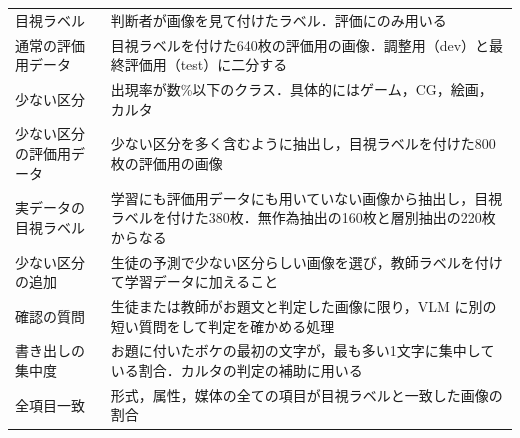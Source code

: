 \begin{table}[t]
\begin{tabular}{>{\raggedright\arraybackslash}p{}>{\raggedright\arraybackslash}p{}}
        目視ラベル & 判断者が画像を見て付けたラベル．評価にのみ用いる \\
        通常の評価用データ & 目視ラベルを付けた640枚の評価用の画像．調整用（dev）と最終評価用（test）に二分する \\
        少ない区分 & 出現率が数\%以下のクラス．具体的にはゲーム，CG，絵画，カルタ \\
        少ない区分の評価用データ & 少ない区分を多く含むように抽出し，目視ラベルを付けた800枚の評価用の画像 \\
        実データの目視ラベル & 学習にも評価用データにも用いていない画像から抽出し，目視ラベルを付けた380枚．無作為抽出の160枚と層別抽出の220枚からなる \\
        少ない区分の追加 & 生徒の予測で少ない区分らしい画像を選び，教師ラベルを付けて学習データに加えること \\
        確認の質問 & 生徒または教師がお題文と判定した画像に限り，VLM に別の短い質問をして判定を確かめる処理 \\
        書き出しの集中度 & お題に付いたボケの最初の文字が，最も多い1文字に集中している割合．カルタの判定の補助に用いる \\
        全項目一致 & 形式，属性，媒体の全ての項目が目視ラベルと一致した画像の割合 \\
        \bottomrule
    \end{tabular}
\end{table}

